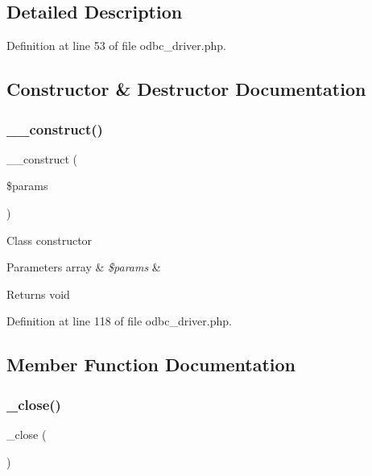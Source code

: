 \subsection{Detailed Description}


Definition at line 53 of file odbc\+\_\+driver.\+php.



\subsection{Constructor \& Destructor Documentation}
\mbox{\label{class_c_i___d_b__odbc__driver_a9162320adff1a1a4afd7f2372f753a3e}} 
\subsubsection{\texorpdfstring{\_\_construct()}{\_\_construct()}}
{\footnotesize\ttfamily \+\_\+\+\_\+construct (\begin{DoxyParamCaption}\item[{}]{\$params }\end{DoxyParamCaption})}

Class constructor


\begin{DoxyParams}[1]{Parameters}
array & {\em \$params} & \\
\hline
\end{DoxyParams}
\begin{DoxyReturn}{Returns}
void 
\end{DoxyReturn}


Definition at line 118 of file odbc\+\_\+driver.\+php.



\subsection{Member Function Documentation}
\mbox{\label{class_c_i___d_b__odbc__driver_a4d9082658000e5ede8312067c6dda9db}} 
\subsubsection{\texorpdfstring{\_close()}{\_close()}}
{\footnotesize\ttfamily \+\_\+close (\begin{DoxyParamCaption}{ }\end{DoxyParamCaption})\hspace{0.3cm}{\ttfamily [protected]}}


